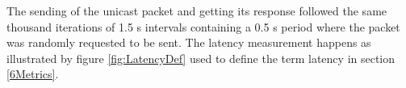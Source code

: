 The sending of the unicast packet and getting its response followed the same thousand iterations of 1.5 s intervals containing a 0.5 s period where the packet was randomly requested to be sent. The latency measurement happens as illustrated by figure \ref{fig:LatencyDef} used to define the term latency in section \ref{6Metrics}.